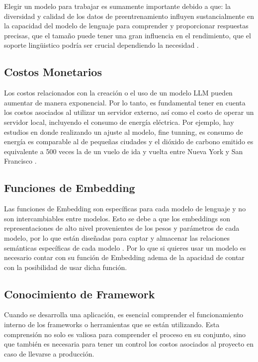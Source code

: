 Elegir un modelo para trabajar es sumamente importante debido a que: la diversidad y calidad de los datos de preentrenamiento influyen 
sustancialmente en la capacidad del modelo de lenguaje para comprender y proporcionar respuestas precisas, que el tamaño puede tener una 
gran influencia en el rendimiento, que el soporte lingüistico podría ser crucial dependiendo la necesidad \cite{modelos1}.


\subsection{Costos Monetarios}
Los costos relacionados con la creación o el uso de un modelo LLM pueden aumentar de manera exponencial. Por lo tanto, es fundamental tener en 
cuenta los costos asociados al utilizar un servidor externo, así como el costo de operar un servidor local, incluyendo el consumo de energía eléctrica.
Por ejemplo, hay estudios en donde realizando un ajuste al modelo, fine tunning, es consumo de energía es comparable al de pequeñas ciudades y el dióxido 
de carbono emitido es equivalente a 500 veces la de un vuelo de ida y vuelta entre Nueva York y San Francisco \cite{ft1}. 


\subsection{Funciones de Embedding}

Las funciones de Embedding son específicas para cada modelo de lenguaje y no son intercambiables entre modelos. Esto se debe a que los embeddings son 
representaciones de alto nivel provenientes de los pesos y parámetros de cada modelo, por lo que están diseñadas para captar y almacenar las relaciones 
semánticas específicas de cada modelo \cite{microsoft1}. Por lo que si quieres usar un modelo es necesario contar con su función de Embedding adema de la 
apacidad de contar con la posibilidad de usar dicha función. 


\subsection{Conocimiento de Framework}
Cuando se desarrolla una aplicación, es esencial comprender el funcionamiento interno de los frameworks o herramientas que se están utilizando. 
Esta comprensión no solo es valiosa para comprender el proceso en su conjunto, sino que también es necesaria para tener un control los costos asociados al 
proyecto en caso de llevarse a producción. 	

